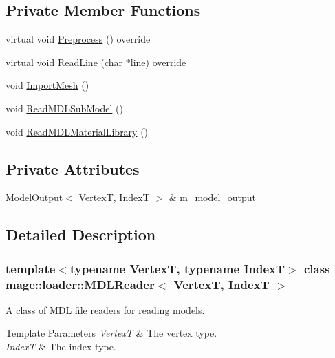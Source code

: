 \subsection*{Private Member Functions}
\begin{DoxyCompactItemize}
\item 
virtual void \hyperlink{classmage_1_1loader_1_1_m_d_l_reader_afe56982cb6a6ba9a2ce4abba9cbe3703}{Preprocess} () override
\item 
virtual void \hyperlink{classmage_1_1loader_1_1_m_d_l_reader_ac820f425a40dcd407434fdff4d420f86}{Read\+Line} (char $\ast$line) override
\item 
void \hyperlink{classmage_1_1loader_1_1_m_d_l_reader_a70ea21ef9309a867303875ad5b7669dc}{Import\+Mesh} ()
\item 
void \hyperlink{classmage_1_1loader_1_1_m_d_l_reader_aa3801a52144ea766d04272202149478e}{Read\+M\+D\+L\+Sub\+Model} ()
\item 
void \hyperlink{classmage_1_1loader_1_1_m_d_l_reader_aae3fcfe8ec5c0894b78b4be1a42b9f60}{Read\+M\+D\+L\+Material\+Library} ()
\end{DoxyCompactItemize}
\subsection*{Private Attributes}
\begin{DoxyCompactItemize}
\item 
\hyperlink{structmage_1_1_model_output}{Model\+Output}$<$ VertexT, IndexT $>$ \& \hyperlink{classmage_1_1loader_1_1_m_d_l_reader_a597a8fc465868965899249b5c94b8a1d}{m\+\_\+model\+\_\+output}
\end{DoxyCompactItemize}


\subsection{Detailed Description}
\subsubsection*{template$<$typename VertexT, typename IndexT$>$\newline
class mage\+::loader\+::\+M\+D\+L\+Reader$<$ Vertex\+T, Index\+T $>$}

A class of M\+DL file readers for reading models.


\begin{DoxyTemplParams}{Template Parameters}
{\em VertexT} & The vertex type. \\
\hline
{\em IndexT} & The index type. \\
\hline
\end{DoxyTemplParams}


